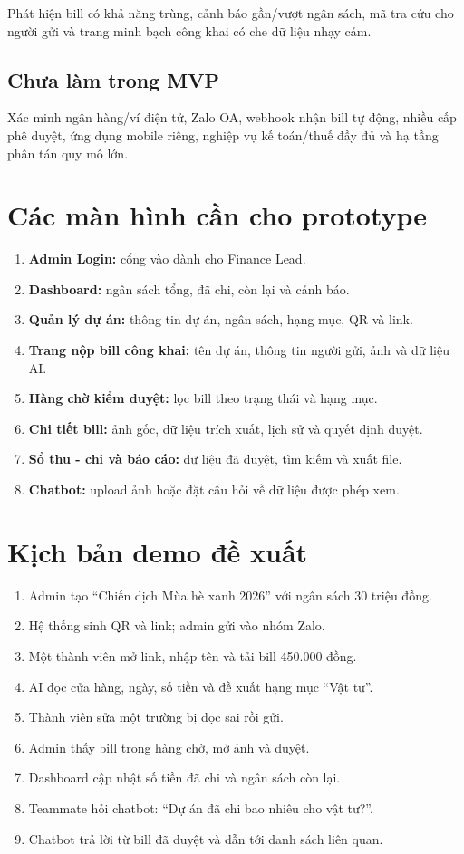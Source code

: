 \documentclass[a4paper,11pt]{article}
\begin{document}
Phát hiện bill có khả năng trùng, cảnh báo gần/vượt ngân sách, mã tra cứu cho người gửi và trang minh bạch công khai có che dữ liệu nhạy cảm.

\subsection{Chưa làm trong MVP}

Xác minh ngân hàng/ví điện tử, Zalo OA, webhook nhận bill tự động, nhiều cấp phê duyệt, ứng dụng mobile riêng, nghiệp vụ kế toán/thuế đầy đủ và hạ tầng phân tán quy mô lớn.

\section{Các màn hình cần cho prototype}

\begin{enumerate}
  \item \textbf{Admin Login:} cổng vào dành cho Finance Lead.
  \item \textbf{Dashboard:} ngân sách tổng, đã chi, còn lại và cảnh báo.
  \item \textbf{Quản lý dự án:} thông tin dự án, ngân sách, hạng mục, QR và link.
  \item \textbf{Trang nộp bill công khai:} tên dự án, thông tin người gửi, ảnh và dữ liệu AI.
  \item \textbf{Hàng chờ kiểm duyệt:} lọc bill theo trạng thái và hạng mục.
  \item \textbf{Chi tiết bill:} ảnh gốc, dữ liệu trích xuất, lịch sử và quyết định duyệt.
  \item \textbf{Sổ thu - chi và báo cáo:} dữ liệu đã duyệt, tìm kiếm và xuất file.
  \item \textbf{Chatbot:} upload ảnh hoặc đặt câu hỏi về dữ liệu được phép xem.
\end{enumerate}

\section{Kịch bản demo đề xuất}

\begin{enumerate}
  \item Admin tạo “Chiến dịch Mùa hè xanh 2026” với ngân sách 30 triệu đồng.
  \item Hệ thống sinh QR và link; admin gửi vào nhóm Zalo.
  \item Một thành viên mở link, nhập tên và tải bill 450.000 đồng.
  \item AI đọc cửa hàng, ngày, số tiền và đề xuất hạng mục “Vật tư”.
  \item Thành viên sửa một trường bị đọc sai rồi gửi.
  \item Admin thấy bill trong hàng chờ, mở ảnh và duyệt.
  \item Dashboard cập nhật số tiền đã chi và ngân sách còn lại.
  \item Teammate hỏi chatbot: “Dự án đã chi bao nhiêu cho vật tư?”.
  \item Chatbot trả lời từ bill đã duyệt và dẫn tới danh sách liên quan.
\end{enumerate}
\end{document}
